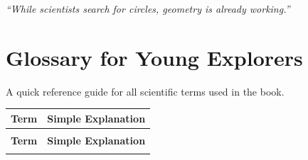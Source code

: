 \documentclass[12pt,a4paper,oneside]{book}
\begin{document}
\vspace{2cm}
\begin{flushright}
\textit{“While scientists search for circles, geometry is already working.”}
\end{flushright}

\chapter*{Glossary for Young Explorers}

A quick reference guide for all scientific terms used in the book.

\renewcommand{\arraystretch}{1.3}
\begin{longtable}{>{\bfseries}p{4.5cm}p{10cm}}
\toprule
\textbf{Term} & \textbf{Simple Explanation} \\
\midrule
\endfirsthead

\multicolumn{2}{c}{{\small\textit{Glossary (continued)}}}\\
\toprule
\textbf{Term} & \textbf{Simple Explanation} \\
\midrule
\endhead

\bottomrule
\endfoot

\bottomrule
\endlastfoot


\end{longtable}
\end{document}
